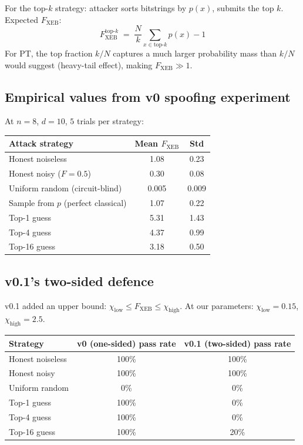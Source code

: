 \documentclass[11pt,a4paper]{article}
\theoremstyle{plain}
\theoremstyle{definition}
\theoremstyle{remark}
\begin{document}
For the top-$k$ strategy: attacker sorts bitstrings by $p(x)$, submits the top $k$. Expected $F_{\mathrm{XEB}}$:
\begin{equation}
F_{\mathrm{XEB}}^{\text{top-}k} \;=\; \frac{N}{k}\sum_{x \in \text{top-}k} p(x) - 1
\end{equation}
For PT, the top fraction $k/N$ captures a much larger probability mass than $k/N$ would suggest (heavy-tail effect), making $F_{\mathrm{XEB}} \gg 1$.

\subsection{Empirical values from v0 spoofing experiment}

At $n=8$, $d=10$, $5$ trials per strategy:

\begin{center}
\small
\begin{tabular}{@{}lcc@{}}
\toprule
\textbf{Attack strategy} & \textbf{Mean $F_{\mathrm{XEB}}$} & \textbf{Std} \\
\midrule
Honest noiseless & 1.08 & 0.23 \\
Honest noisy ($F=0.5$) & 0.30 & 0.08 \\
Uniform random (circuit-blind) & 0.005 & 0.009 \\
Sample from $p$ (perfect classical) & 1.07 & 0.22 \\
Top-1 guess & 5.31 & 1.43 \\
Top-4 guess & 4.37 & 0.99 \\
Top-16 guess & 3.18 & 0.50 \\
\bottomrule
\end{tabular}
\end{center}

\subsection{v0.1's two-sided defence}

v0.1 added an upper bound: $\chi_{\mathrm{low}} \leq F_{\mathrm{XEB}} \leq \chi_{\mathrm{high}}$. At our parameters: $\chi_{\mathrm{low}} = 0.15$, $\chi_{\mathrm{high}} = 2.5$.

\begin{center}
\small
\begin{tabular}{@{}lcc@{}}
\toprule
\textbf{Strategy} & \textbf{v0 (one-sided) pass rate} & \textbf{v0.1 (two-sided) pass rate} \\
\midrule
Honest noiseless & 100\% & 100\% \\
Honest noisy & 100\% & 100\% \\
Uniform random & 0\% & 0\% \\
Top-1 guess & 100\% & 0\% \\
Top-4 guess & 100\% & 0\% \\
Top-16 guess & 100\% & 20\% \\
\bottomrule
\end{tabular}
\end{center}
\end{document}
